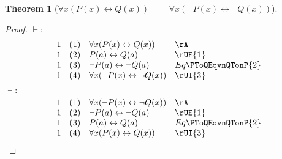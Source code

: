\documentclass{book}
\theoremstyle{plain}
\newtheorem{theorem}{Theorem}
\theoremstyle{remark}
\theoremstyle{definition}
\begin{document}
\label{FaxLpPLpxRpLrQLpxRpRpEqvFaxLpnPLpxRpLrnQLpxRpRp}
\begin{theorem}[\(\forall x(P(x) \leftrightarrow Q(x)) \dashv \vdash \forall x(\neg P(x) \leftrightarrow \neg Q(x))\)]
\end{theorem}
\begin{proof}
	\(\vdash:\)
	\[
	\begin{array}{llll}
		1 & (1) & \forall x (P(x) \leftrightarrow Q(x)) & \rA \\
		1 & (2) & P(a) \leftrightarrow Q(a) & \rUE{1} \\
		1 & (3) & \neg P(a) \leftrightarrow \neg Q(a) & Eq\PToQEqvnQTonP{2} \\
		1 & (4) & \forall x (\neg P(x) \leftrightarrow \neg Q(x)) & \rUI{3} \\
	\end{array}
	\]
	\(\dashv:\)
	\[
	\begin{array}{llll}
		1 & (1) & \forall x (\neg P(x) \leftrightarrow \neg Q(x)) & \rA \\
		1 & (2) & \neg P(a) \leftrightarrow \neg Q(a) & \rUE{1} \\
		1 & (3) & P(a) \leftrightarrow Q(a) & Eq\PToQEqvnQTonP{2} \\
		1 & (4) & \forall x (P(x) \leftrightarrow Q(x)) & \rUI{3} \\
	\end{array}
	\]
\end{proof}
\end{document}
